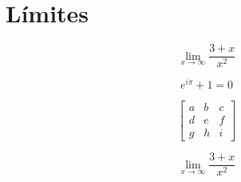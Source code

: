 \section*{Límites}
\begin{equation}
    \lim_{x\rightarrow\infty}\frac{3+x}{x^2} 
    \label{eq:limites}
\end{equation}


\begin{equation}
    e^{i\pi} + 1 = 0
    \label{eq:euler}
\end{equation}

\begin{equation}
    \left[
    \begin{matrix}
     a & b & c \\
     d & e & f \\
     g & h & i
    \end{matrix}
    \right]
    \label{eq:matriz}
\end{equation}

\begin{equation}
    \lim_{x\rightarrow\infty}\frac{3+x}{x^2}
    \label{eq:limites}
\end{equation}

\cite{blog:ejemplo}